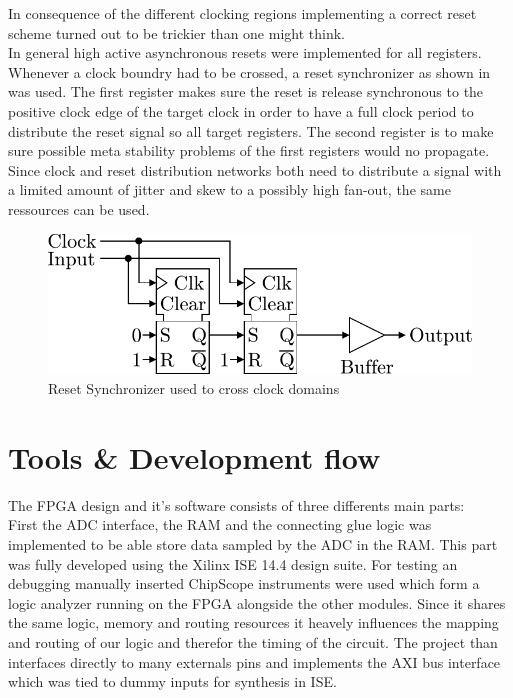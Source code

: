 In consequence of the different clocking regions implementing a correct
reset scheme turned out to be trickier than one might think. \\

In general high active asynchronous resets were implemented for all
registers. Whenever a clock boundry had to be crossed, a reset synchronizer
as shown in  was used. The first register
makes sure the reset is release synchronous to the positive clock edge
of the target clock in order to have a full clock period to distribute
the reset signal so all target registers. The second register is
to make sure possible meta stability problems of the first registers would
no propagate. Since clock and reset distribution networks both need to
distribute a signal with a limited amount of jitter and skew to a possibly
high fan-out, the same ressources can be used.  \\

\begin{figure}
  \centering
  \includegraphics{figures/RstSync}
  \caption{Reset Synchronizer used to cross clock domains}
  \label{fig:fpga_rst_sync}
\end{figure}


\section{Tools \& Development flow}
\label{sec:fpga_tools}

The \gls{FPGA} design and it's software consists of three differents
main parts: \\

First the \gls{ADC} interface, the \gls{RAM} and the connecting
glue logic was implemented to be able store data sampled by the \gls{ADC}
in the \gls{RAM}. This part was fully developed using the Xilinx ISE 14.4
design suite. For testing an debugging manually inserted ChipScope
instruments were used which form a logic analyzer running on the \gls{FPGA}
alongside the other modules. Since it shares the same logic, memory and
routing resources it heavely influences the mapping and routing of our
logic and therefor the timing of the circuit. The project than interfaces
directly to many externals pins and implements the \gls{AXI} bus interface
which was tied to dummy inputs for synthesis in ISE. \\


